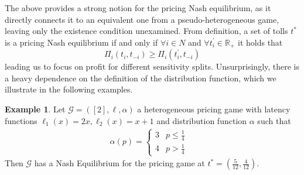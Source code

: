 \documentclass[10pt,a4paper]{book}
\newcommand{\R}{\mathbb{R}}
\newcommand{\Gm}{\mathcal{G}}
\theoremstyle{definition}
\theoremstyle{comment}
\newtheorem{example}[definition]{Example}
\begin{document}
The above provides a strong notion for the pricing Nash equilibrium, as it directly connects it to an equivalent one from a pseudo-heterogeneous game, leaving only the existence condition unexamined.
From definition, a set of tolls $t^*$ is a pricing Nash equilibrium if and only if $\forall i \in N$ and $\forall t_i^\prime \in \R_+$ it holds that
\[\Pi_i(t_i, t_{-i}) \geq \Pi_i(t_i^\prime, t_{-i})\]
leading us to focus on profit for different sensitivity splits.
Unsurprisingly, there is a heavy dependence on the definition of the distribution function, which we illustrate in the following examples.

\begin{example}
	\label{example:a_step_profit_ne}
	Let $\Gm = ([2], \ell, \alpha)$ a heterogeneous pricing game with latency functions $\ell_1(x) = 2x, \ell_2(x) = x + 1$ and distribution function $\alpha$ such that
	\begin{align*}
		\alpha(p) =
		\begin{cases}
			3 & p \le \tfrac14 \\
			4 & p > \tfrac14
		\end{cases}&
	\end{align*}
	Then $\Gm$ has a Nash Equilibrium for the pricing game at $t^* = \left(\tfrac{5}{12}, \tfrac{4}{12}\right)$.
\end{example}
\end{document}
